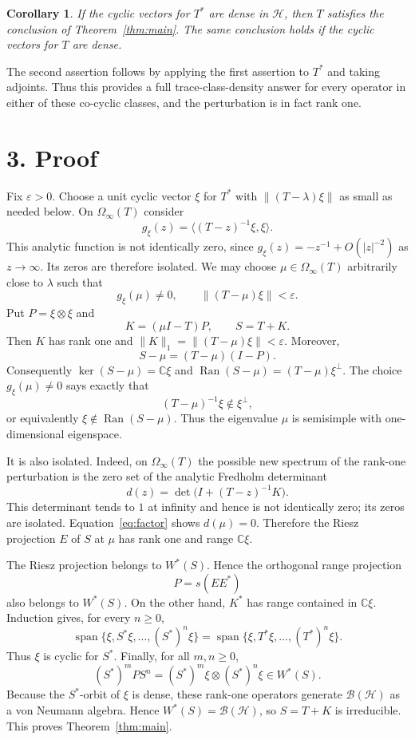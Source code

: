 \documentclass[11pt]{article}
\newtheorem{corollary}[theorem]{Corollary}
\newcommand{\B}{\mathcal B}
\newcommand{\C}{\mathbb C}
\newcommand{\Hh}{\mathcal H}
\newcommand{\Ran}{\operatorname{Ran}}
\begin{document}
\begin{corollary}\label{cor:dense}
If the cyclic vectors for $T^*$ are dense in $\Hh$, then $T$ satisfies the conclusion of Theorem~\ref{thm:main}.  The same conclusion holds if the cyclic vectors for $T$ are dense.
\end{corollary}

The second assertion follows by applying the first assertion to $T^*$ and taking adjoints.  Thus this provides a full trace-class-density answer for every operator in either of these co-cyclic classes, and the perturbation is in fact rank one.

\section*{3. Proof}

Fix $\varepsilon>0$.  Choose a unit cyclic vector $\xi$ for $T^*$ with
$\lVert(T-\lambda)\xi\rVert$ as small as needed below.  On $\Omega_\infty(T)$ consider
\[
 g_\xi(z)=\big\langle (T-z)^{-1}\xi,\xi\big\rangle .
\]
This analytic function is not identically zero, since
$g_\xi(z)=-z^{-1}+O(|z|^{-2})$ as $z\to\infty$.  Its zeros are therefore isolated.  We may choose
$\mu\in\Omega_\infty(T)$ arbitrarily close to $\lambda$ such that
\[
 g_\xi(\mu)\ne0,
 \qquad \lVert(T-\mu)\xi\rVert<\varepsilon.
\]
Put $P=\xi\otimes\xi$ and
\[
 K=(\mu I-T)P,
 \qquad S=T+K.
\]
Then $K$ has rank one and
$\lVert K\rVert_1=\lVert(T-\mu)\xi\rVert<\varepsilon$.  Moreover,
\begin{equation}\label{eq:factor}
 S-\mu=(T-\mu)(I-P).
\end{equation}
Consequently $\ker(S-\mu)=\C\xi$ and
$\Ran(S-\mu)=(T-\mu)\xi^\perp$.  The choice $g_\xi(\mu)\ne0$ says exactly that
\[
 (T-\mu)^{-1}\xi\notin\xi^\perp,
\]
or equivalently $\xi\notin\Ran(S-\mu)$.  Thus the eigenvalue $\mu$ is semisimple with one-dimensional eigenspace.

It is also isolated.  Indeed, on $\Omega_\infty(T)$ the possible new spectrum of the rank-one perturbation is the zero set of the analytic Fredholm determinant
\[
 d(z)=\det\bigl(I+(T-z)^{-1}K\bigr).
\]
This determinant tends to $1$ at infinity and hence is not identically zero; its zeros are isolated.  Equation~\eqref{eq:factor} shows $d(\mu)=0$.  Therefore the Riesz projection $E$ of $S$ at $\mu$ has rank one and range $\C\xi$.

The Riesz projection belongs to $W^*(S)$.  Hence the orthogonal range projection
\[
 P=s(EE^*)
\]
also belongs to $W^*(S)$.  On the other hand, $K^*$ has range contained in $\C\xi$.  Induction gives, for every $n\geq0$,
\[
 \operatorname{span}\{\xi,S^*\xi,\ldots,(S^*)^n\xi\}
 =
 \operatorname{span}\{\xi,T^*\xi,\ldots,(T^*)^n\xi\}.
\]
Thus $\xi$ is cyclic for $S^*$.  Finally, for all $m,n\geq0$,
\[
 (S^*)^m P S^n=(S^*)^m\xi\otimes(S^*)^n\xi\in W^*(S).
\]
Because the $S^*$-orbit of $\xi$ is dense, these rank-one operators generate
$\B(\Hh)$ as a von Neumann algebra.  Hence $W^*(S)=\B(\Hh)$, so $S=T+K$ is irreducible.  This proves Theorem~\ref{thm:main}.
\end{document}
